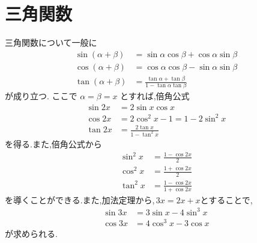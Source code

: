 \section{三角関数}\label{節：三角関数}
  三角関数について一般に
  \begin{align*}
    \sin(\alpha+\beta)
      &=\sin\alpha\cos\beta+\cos\alpha\sin\beta\\
    \cos(\alpha+\beta)
      &=\cos\alpha\cos\beta-\sin\alpha\sin\beta\\
    \tan(\alpha+\beta)
      &=\frac{\tan\alpha+\tan\beta}
              {1-\tan\alpha\tan\beta}
  \end{align*}
  が成り立つ.
  ここで $\alpha=\beta=x$ とすれば,倍角公式
  \begin{align*}
    \sin 2x&=2\sin x\cos x\\
    \cos 2x&=2\cos^2x-1=1-2\sin^2x\\
    \tan 2x&=\frac{2\tan x}{1-\tan^2x}
  \end{align*}
  を得る.また,倍角公式から
  \begin{align*}
    \sin^2x&=\frac{1-\cos 2x}{2}\\
    \cos^2x&=\frac{1+\cos 2x}{2}\\
    \tan^2x&=\frac{1-\cos 2x}{1+\cos 2x}
  \end{align*}
  を導くことができる.また,加法定理から,\,$3x=2x+x$とすることで,
  \begin{align*}
    \sin 3x&=3\sin x-4\sin^3x\\
    \cos 3x&=4\cos^3x-3\cos x
  \end{align*}
  が求められる.
